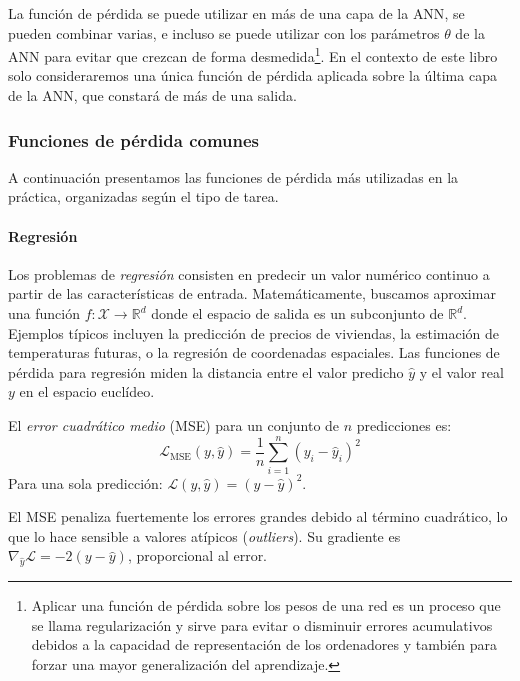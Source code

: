 La función de pérdida se puede utilizar en más de una capa de la \gls{ANN}, se pueden combinar varias, e incluso se puede utilizar con los parámetros \(\theta\) de la \gls{ANN} para evitar que crezcan de forma desmedida\footnote{Aplicar una función de pérdida sobre los pesos de una red es un proceso que se llama regularización y sirve para evitar o disminuir errores acumulativos debidos a la capacidad de representación de los ordenadores y también para forzar una mayor generalización del aprendizaje.}. En el contexto de este libro solo consideraremos una única función de pérdida aplicada sobre la última capa de la \gls{ANN}, que constará de más de una salida.


\subsubsection{Funciones de pérdida comunes}

A continuación presentamos las funciones de pérdida más utilizadas en la práctica, organizadas según el tipo de tarea.

\paragraph{Regresión}

Los problemas de \textit{regresión} consisten en predecir un valor numérico continuo a partir de las características de entrada. Matemáticamente, buscamos aproximar una función \(f: \mathcal{X} \to \mathbb{R}^d\) donde el espacio de salida es un subconjunto de \(\mathbb{R}^d\). Ejemplos típicos incluyen la predicción de precios de viviendas, la estimación de temperaturas futuras, o la regresión de coordenadas espaciales. Las funciones de pérdida para regresión miden la distancia entre el valor predicho \(\hat{y}\) y el valor real \(y\) en el espacio euclídeo.

\begin{definition}\label{def:mse}
	El \textit{error cuadrático medio} (\gls{MSE}) para un conjunto de \(n\) predicciones es:
	\[
		\mathcal{L}_{\text{MSE}}(y, \hat{y}) = \frac{1}{n} \sum_{i=1}^{n} (y_i - \hat{y}_i)^2
	\]
	Para una sola predicción: \(\mathcal{L}(y, \hat{y}) = (y - \hat{y})^2\).
\end{definition}

El \gls{MSE} penaliza fuertemente los errores grandes debido al término cuadrático, lo que lo hace sensible a valores atípicos (\textit{outliers}). Su gradiente es \(\nabla_{\hat{y}} \mathcal{L} = -2(y - \hat{y})\), proporcional al error.

